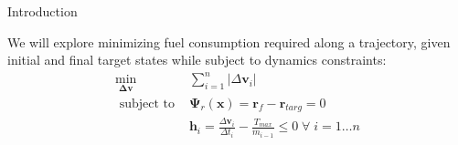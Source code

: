 

    

\begin{frame}{Introduction} 

    We will explore minimizing fuel consumption required along a trajectory, given initial and final target states while subject to dynamics constraints: 
% 
    \begin{align}
        \min_{ \boldsymbol{ \Delta \boldsymbol{v} } }     & \sum_{i=1}^{n} | \Delta \boldsymbol{v}_i | \\ 
        \text{ subject to }         & \boldsymbol{\Psi}_r ( \boldsymbol{x} ) = \boldsymbol{r}_f - \boldsymbol{r}_{targ} = 0 \\  
                                    & \boldsymbol{h}_i = \frac{ \Delta \boldsymbol{v}_i }{ \Delta t_i } - \frac{ T_{max} }{ m_{i-1} } \leq 0 \; \forall \; i = 1 \hdots n 
    \end{align} 
    
\end{frame} 


